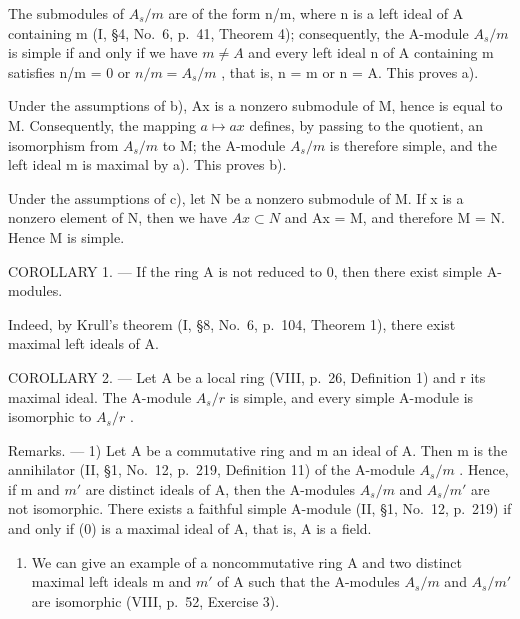 The submodules of \(A_{s}/m\) are of the form n/m, where n is a left ideal of A containing m (I, §4, No.~6, p.~41, Theorem 4); consequently, the A-module \(A_{s}/m\) is simple if and only if we have \(m \neq A\) and every left ideal n of A containing m satisfies n/m = 0 or \(n/m = A_{s}/m\) , that is, n = m or n = A. This proves a).

Under the assumptions of b), Ax is a nonzero submodule of M, hence is equal to M. Consequently, the mapping \(a \mapsto ax\) defines, by passing to the quotient, an isomorphism from \(A_{s}/m\) to M; the A-module \(A_{s}/m\) is therefore simple, and the left ideal m is maximal by a). This proves b).

Under the assumptions of c), let N be a nonzero submodule of M. If x is a nonzero element of N, then we have \(Ax \subset N\) and Ax = M, and therefore M = N. Hence M is simple.

COROLLARY 1. --- If the ring A is not reduced to 0, then there exist simple A-modules.

Indeed, by Krull's theorem (I, §8, No.~6, p.~104, Theorem 1), there exist maximal left ideals of A.

COROLLARY 2. --- Let A be a local ring (VIII, p.~26, Definition 1) and r its maximal ideal. The A-module \(A_{s}/r\) is simple, and every simple A-module is isomorphic to \(A_{s}/r\) .

Remarks. --- 1) Let A be a commutative ring and m an ideal of A. Then m is the annihilator (II, §1, No.~12, p.~219, Definition 11) of the A-module \(A_{s}/m\) . Hence, if m and \(m'\) are distinct ideals of A, then the A-modules \(A_{s}/m\) and \(A_{s}/m'\) are not isomorphic. There exists a faithful simple A-module (II, §1, No.~12, p.~219) if and only if (0) is a maximal ideal of A, that is, A is a field.

\begin{enumerate}
\def\labelenumi{\arabic{enumi})}
\setcounter{enumi}{1}
\tightlist
\item
  We can give an example of a noncommutative ring A and two distinct maximal left ideals m and \(m'\) of A such that the A-modules \(A_{s}/m\) and \(A_{s}/m'\) are isomorphic (VIII, p.~52, Exercise 3).
\end{enumerate}

